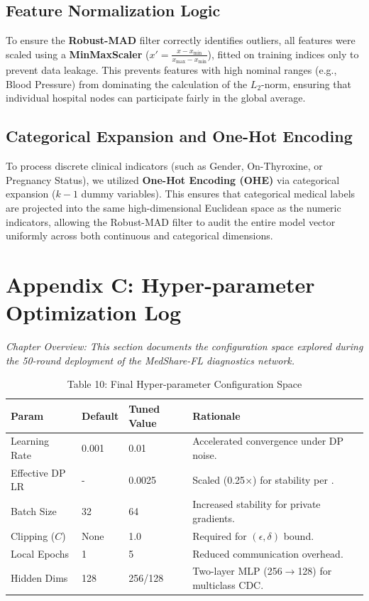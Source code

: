 \documentclass[10pt, a4paper, twocolumn]{article}
\begin{document}
\subsection*{Feature Normalization Logic}
To ensure the \textbf{Robust-MAD} filter correctly identifies outliers, all features were scaled using a \textbf{MinMaxScaler} ($x' = \frac{x - x_{\min}}{x_{\max} - x_{\min}}$), fitted on training indices only to prevent data leakage. This prevents features with high nominal ranges (e.g., Blood Pressure) from dominating the calculation of the $L_2$-norm, ensuring that individual hospital nodes can participate fairly in the global average.

\subsection*{Categorical Expansion and One-Hot Encoding}
To process discrete clinical indicators (such as Gender, On-Thyroxine, or Pregnancy Status), we utilized \textbf{One-Hot Encoding (OHE)} via categorical expansion ($k-1$ dummy variables). This ensures that categorical medical labels are projected into the same high-dimensional Euclidean space as the numeric indicators, allowing the Robust-MAD filter to audit the entire model vector uniformly across both continuous and categorical dimensions.

\section*{Appendix C: Hyper-parameter Optimization Log}

\textit{Chapter Overview: This section documents the configuration space explored during the 50-round deployment of the MedShare-FL diagnostics network.}

\begin{table}[hbt!]
\centering
\scriptsize
\begin{tabular}{lp{1.5cm}p{1.5cm}p{2.5cm}}
\toprule
\textbf{Param} & \textbf{Default} & \textbf{Tuned Value} & \textbf{Rationale} \\
\midrule
Learning Rate & 0.001 & 0.01 & Accelerated convergence under DP noise. \\
Effective DP LR & - & 0.0025 & Scaled (0.25$\times$) for stability per \cite{abadi2016}. \\
Batch Size & 32 & 64 & Increased stability for private gradients. \\
Clipping ($C$) & None & 1.0 & Required for $(\epsilon, \delta)$ bound. \\
Local Epochs & 1 & 5 & Reduced communication overhead. \\
Hidden Dims & 128 & 256/128 & Two-layer MLP (256$\to$128) for multiclass CDC. \\
\bottomrule
\end{tabular}
\caption{Table 10: Final Hyper-parameter Configuration Space}
\end{table}
\end{document}
